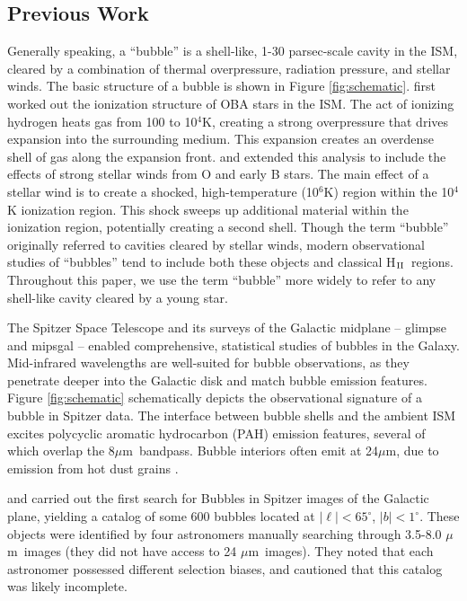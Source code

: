 \documentclass[preprint]{aastex}
\newcommand{\um}[0]{$\mu$m}
\newcommand{\hii}[0]{H$_{\rm II}$}
\begin{document}
\subsection{Previous Work}
\label{sec:previous}

Generally speaking, a ``bubble'' is a shell-like, 1-30 parsec-scale cavity in the ISM, cleared by a combination of thermal overpressure, radiation pressure, and stellar winds. The basic structure of a bubble is shown in Figure \ref{fig:schematic}. \cite{Stromgren39} first worked out the ionization structure of OBA stars in the ISM. The act of ionizing hydrogen heats gas from 100 to 10$^4$K, creating a strong overpressure that drives expansion into the surrounding medium. This expansion creates an overdense shell of gas along the expansion front. \cite{Castor75} and \cite{Weaver77} extended this analysis to include the effects of strong stellar winds from O and early B stars. The main effect of a stellar wind is to create a shocked, high-temperature (10$^6$K) region within the 10$^4$K ionization region. This shock sweeps up additional material within the ionization region, potentially creating a second shell. Though the term ``bubble'' originally referred to cavities cleared by stellar winds, modern observational studies of ``bubbles'' tend to include both these objects and classical \hii\, regions. Throughout this paper, we use the term ``bubble'' more widely to refer to any shell-like cavity cleared by a young star.

The Spitzer Space Telescope and its surveys of the Galactic midplane -- {\sc glimpse} \citep{Benjamin03} and {\sc mipsgal} \citep{Carey09} -- enabled comprehensive, statistical studies of bubbles in the Galaxy. Mid-infrared wavelengths are well-suited for bubble observations, as they penetrate deeper into the Galactic disk and match bubble emission features. Figure \ref{fig:schematic} schematically depicts the observational signature of a bubble in Spitzer data. The interface between bubble shells and the ambient ISM excites polycyclic aromatic hydrocarbon (PAH) emission features, several of which overlap the 8\um\, bandpass. Bubble interiors often emit at 24\um, due to emission from hot dust grains \citep{Everett10}. 

\cite{Churchwell06} and \cite{Churchwell07} carried out the first search for Bubbles in Spitzer images of the Galactic plane, yielding  a catalog of some 600 bubbles located at $|\ell| < 65^\circ$, $|b| < 1^\circ$. These objects were identified by four astronomers manually searching through 3.5-8.0 \um\, images (they did not have access to 24 \um\, images). They noted that each astronomer possessed different selection biases, and cautioned that this catalog was likely incomplete.
\end{document}
